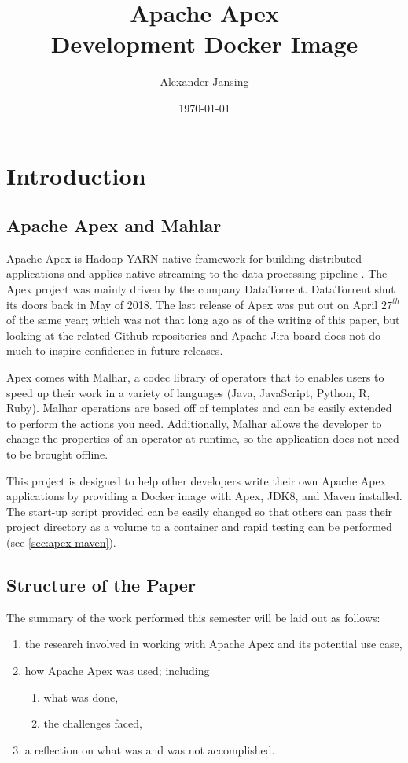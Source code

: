 \documentclass[final]{IEEEtran}
\title{Apache Apex \\ \normalsize Development Docker Image}
\author{Alexander Jansing}
\date{\today}
\begin{document}
\maketitle



\section{Introduction}
\subsection{Apache Apex and Mahlar}
Apache Apex is Hadoop YARN-native framework for building distributed applications and applies native streaming to the data processing pipeline \cite{WEISE}. The Apex project was mainly driven by the company DataTorrent. DataTorrent shut its doors back in May of 2018\cite{WIKI}\cite{DATANAMI}. The last release of Apex was put out on April $27^{th}$ of the same year; which was not that long ago as of the writing of this paper, but looking at the related Github repositories and Apache Jira board does not do much to inspire confidence in future releases.

Apex comes with Malhar, a codec library of operators that to enables users to speed up their work in a variety of languages (Java, JavaScript, Python, R, Ruby). Malhar operations are based off of templates and can be easily extended to perform the actions you need. Additionally, Malhar allows the developer to change the properties of an operator at runtime, so the application does not need to be brought offline\cite{MALHAR-DOCS}.

This project is designed to help other developers write their own Apache Apex applications by providing a Docker image with Apex, JDK8, and Maven installed. The start-up script provided can be easily changed so that others can pass their project directory as a volume to a container and rapid testing can be performed (see \ref{sec:apex-maven}).

\subsection{Structure of the Paper}
The summary of the work performed this semester will be laid out as follows:
\begin{enumerate}
  \item the research involved in working with Apache Apex and its potential use case,
  \item how Apache Apex was used; including
  \begin{enumerate}
    \item what was done,
    \item the challenges faced,
  \end{enumerate}
  \item a reflection on what was and was not accomplished.
\end{enumerate}
\end{document}
